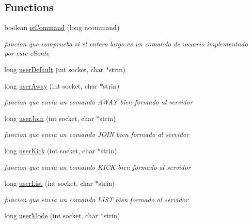 \subsection*{Functions}
\begin{DoxyCompactItemize}
\item 
boolean \hyperlink{_g-2301-05-_p2-user_commands_8c_a8298aa0faf55aaec114edcb8d908c25e}{is\-Command} (long ncommand)
\begin{DoxyCompactList}\small\item\em funcion que comprueba si el entero largo es un comando de usuario implementado por este cliente \end{DoxyCompactList}\item 
long \hyperlink{_g-2301-05-_p2-user_commands_8c_ac0f28bc6174a23bc74895136febcc3d9}{user\-Default} (int socket, char $\ast$strin)
\item 
long \hyperlink{_g-2301-05-_p2-user_commands_8c_ad4918963d95cb113d1880341f5f6d35d}{user\-Away} (int socket, char $\ast$strin)
\begin{DoxyCompactList}\small\item\em funcion que envia un comando A\-W\-A\-Y bien formado al servidor \end{DoxyCompactList}\item 
long \hyperlink{_g-2301-05-_p2-user_commands_8c_a1c5dfac34cc7c7e9f4f4ae92d480c860}{user\-Join} (int socket, char $\ast$strin)
\begin{DoxyCompactList}\small\item\em funcion que envia un comando J\-O\-I\-N bien formado al servidor \end{DoxyCompactList}\item 
long \hyperlink{_g-2301-05-_p2-user_commands_8c_a1160187ecb124da41bd62d3987f493ec}{user\-Kick} (int socket, char $\ast$strin)
\begin{DoxyCompactList}\small\item\em funcion que envia un comando K\-I\-C\-K bien formado al servidor \end{DoxyCompactList}\item 
long \hyperlink{_g-2301-05-_p2-user_commands_8c_a5f1403750b505dd46e42b4ee15f746da}{user\-List} (int socket, char $\ast$strin)
\begin{DoxyCompactList}\small\item\em funcion que envia un comando L\-I\-S\-T bien formado al servidor \end{DoxyCompactList}\item 
long \hyperlink{_g-2301-05-_p2-user_commands_8c_a97047be2e2e4c4de7a0b50bf5dbab322}{user\-Mode} (int socket, char $\ast$strin)

\end{DoxyCompactItemize}
